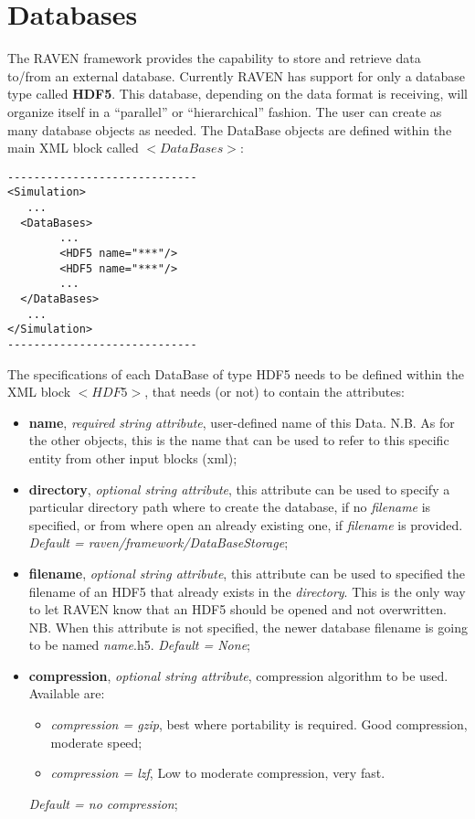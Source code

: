 \section{Databases}
\label{sec:Databases}
The RAVEN framework provides the capability to store and retrieve data to/from an external database. Currently RAVEN has support for only a database type called \textbf{HDF5}. This database, depending on the data format is receiving, will organize itself in a ``parallel'' or ``hierarchical'' fashion. The user can create as many database objects as needed.
The DataBase objects are defined  within the main XML block called $<DataBases>$:
\begin{lstlisting}[style=XML]
-----------------------------
<Simulation>
   ...
  <DataBases>
        ...
        <HDF5 name="***"/>
        <HDF5 name="***"/>
        ...
  </DataBases>
   ...
</Simulation>
-----------------------------
\end{lstlisting}
The specifications of each DataBase of type HDF5 needs to be defined within the XML block $<HDF5>$, that  needs (or not) to contain  the attributes:
\vspace{-5mm}
\begin{itemize}
\itemsep0em
\item \textbf{name}, \textit{required string attribute}, user-defined name of this Data. N.B. As for the other objects, this is the name that can be used to refer to this specific entity from other input blocks (xml);
\item \textbf{directory}, \textit{optional string attribute}, this attribute can be used to specify a particular directory path where to create the database, if no \textit{filename} is specified, or from where open an already existing one, if \textit{filename} is provided. \textit{Default = raven/framework/DataBaseStorage};
\item \textbf{filename}, \textit{optional string attribute}, this attribute can be used to specified the filename of an HDF5 that already exists in the \textit{directory}. This is the only way to let RAVEN know that an HDF5 should be opened and not overwritten. NB. When this attribute is not specified, the newer database filename is going to be named \textit{name}.h5. \textit{Default = None};
\item \textbf{compression}, \textit{optional string attribute}, compression algorithm to be used. Available are:
   \begin{itemize}
      \item \textit{compression = gzip}, best where portability is required. Good compression, moderate speed;
      \item \textit{compression = lzf}, Low to moderate compression, very fast.
   \end{itemize}
  \textit{Default = no compression};
\end{itemize}


